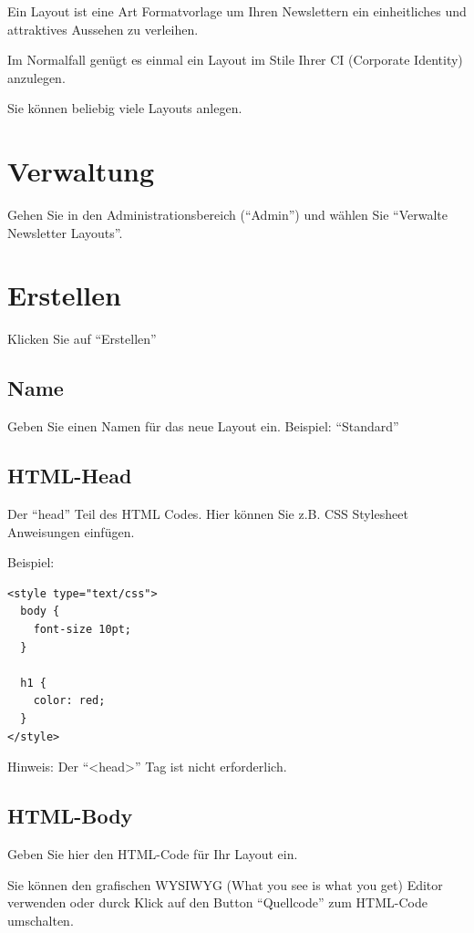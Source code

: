 \documentclass[article, a4paper, oneside, 11pt]{memoir}
\begin{document}
Ein Layout ist eine Art Formatvorlage um Ihren Newslettern ein einheitliches und attraktives Aussehen zu verleihen.

Im Normalfall genügt es einmal ein Layout im Stile Ihrer CI (Corporate Identity) anzulegen.

Sie können beliebig viele Layouts anlegen.


\section{Verwaltung}

Gehen Sie in den Administrationsbereich ("`Admin"') und wählen Sie "`Verwalte Newsletter Layouts"'.

\section{Erstellen}
\label{sec:create-layout}

Klicken Sie auf "`Erstellen"'

\subsection{Name}

Geben Sie einen Namen für das neue Layout ein. Beispiel: "`Standard"'

\subsection{HTML-Head}

Der "`head"' Teil des HTML Codes. Hier können Sie z.B. CSS Stylesheet Anweisungen einfügen.

Beispiel:

\begin{lstlisting}
<style type="text/css">
  body {
    font-size 10pt; 
  }
  
  h1 { 
    color: red;
  } 
</style>
\end{lstlisting}

Hinweis: Der "`<head>"' Tag ist nicht erforderlich.

\subsection{HTML-Body}

Geben Sie hier den HTML-Code für Ihr Layout ein.

Sie können den grafischen WYSIWYG (What you see is what you get) Editor verwenden oder durck Klick auf den Button "`Quellcode"' zum HTML-Code umschalten.
\end{document}
